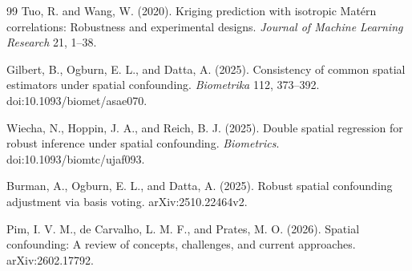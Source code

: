 \documentclass{article}
\begin{document}
\begin{thebibliography}{99}
   Tuo, R. and Wang, W. (2020). Kriging prediction with isotropic Mat\'ern correlations: Robustness and experimental designs. \emph{Journal of Machine Learning Research} 21, 1--38.

   Gilbert, B., Ogburn, E. L., and Datta, A. (2025). Consistency of common spatial estimators under spatial confounding. \emph{Biometrika} 112, 373--392. doi:10.1093/biomet/asae070.

   Wiecha, N., Hoppin, J. A., and Reich, B. J. (2025). Double spatial regression for robust inference under spatial confounding. \emph{Biometrics}. doi:10.1093/biomtc/ujaf093.

   Burman, A., Ogburn, E. L., and Datta, A. (2025). Robust spatial confounding adjustment via basis voting. arXiv:2510.22464v2.

   Pim, I. V. M., de Carvalho, L. M. F., and Prates, M. O. (2026). Spatial confounding: A review of concepts, challenges, and current approaches. arXiv:2602.17792.

\end{thebibliography}
\end{document}
